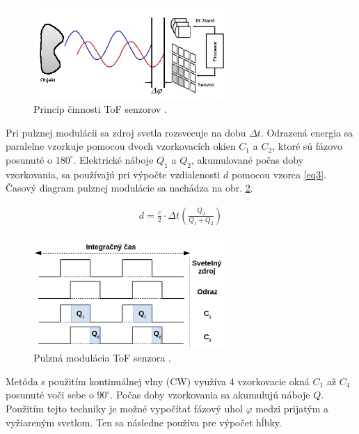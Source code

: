 \begin{figure}[h]
	\centering
	\includegraphics[width=0.65\textwidth]{figures/tof_principle.png} 
	\caption{Princíp činnosti ToF senzorov \cite{hansard2012time}.}
	\label{fig:tof_principle}
\end{figure}

Pri pulznej modulácii sa zdroj svetla rozsvecuje na dobu $\Delta t$. Odrazená energia sa paralelne vzorkuje pomocou dvoch vzorkovacích okien $C_1$ a $C_2$, ktoré sú fázovo posunuté o $180^\circ$. Elektrické náboje $Q_1$ a $Q_2$, akumulované počas doby vzorkovania, sa používajú pri výpočte vzdialenosti $d$ pomocou vzorca \ref{eq3}. Časový diagram pulznej modulácie sa nachádza na obr. \ref{fig:tof_principle_a}. 

\begin{equation}
\label{eq3}
\begin{aligned}
d=\frac{c}{2}\cdot\Delta t \left( \frac{Q_2}{Q_1 + Q_2}\right) 
\end{aligned}
\end{equation}


\begin{figure}[H]
	\centering
	\includegraphics[width=0.65\textwidth]{figures/tof_principle_b.png} 
	\caption{Pulzná modulácia ToF senzora \cite{li2014time}.}
	\label{fig:tof_principle_a}
\end{figure}

Metóda s použitím kontinuálnej vlny (CW) využíva 4 vzorkovacie okná $C_1$ až $C_4$ posunuté voči sebe o $90^\circ$. Počas doby vzorkovania sa akumulujú náboje $Q$. Použitím tejto techniky je možné vypočítať fázový uhol $\varphi$ medzi prijatým a vyžiareným svetlom. Ten sa následne používa pre výpočet hĺbky. 

